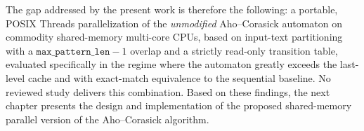 The gap addressed by the present work is therefore the following: a portable,
POSIX Threads parallelization of the \emph{unmodified} Aho--Corasick automaton on
commodity shared-memory multi-core CPUs, based on input-text partitioning with a
$\texttt{max\_pattern\_len}-1$ overlap and a strictly read-only transition table,
evaluated specifically in the regime where the automaton greatly exceeds the
last-level cache and with exact-match equivalence to the sequential baseline. No
reviewed study delivers this combination.
Based on these findings, the next chapter presents the design and implementation
of the proposed shared-memory parallel version of the Aho--Corasick algorithm.

